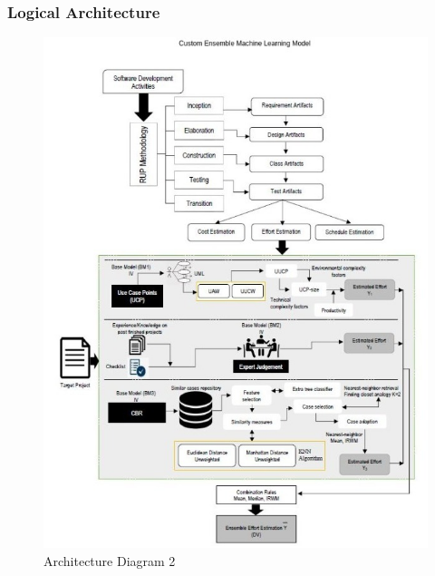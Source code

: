 \subsubsection{Logical Architecture}
\begin{figure}[H]
    \centering
    \includegraphics[scale=0.4]{./diagrams/architecture-diagram-2.jpeg}
    \caption{Architecture Diagram 2}
    \label{fig:arch-diag-}

\end{figure}


